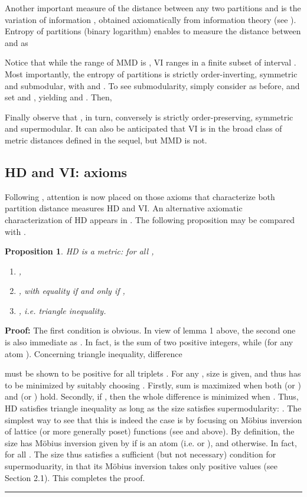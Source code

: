 \documentclass[a4paper,10pt]{article}
\newtheorem{proposition}[theorem]{Proposition}
\newenvironment{proof}[1][Proof]{\noindent\textbf{#1: }}{\ \rule{0.5em}{0.5em}}
\begin{document}
Another important measure of the distance between any two partitions  and  is the variation of information , obtained axiomatically from information theory (see
\cite[Expressions (15)-(22), pages 879-80]{Meila2007}). Entropy  of partitions  (binary logarithm) enables to measure the distance between  and  as

Notice that while the range of MMD is , VI ranges in a finite subset of interval . Most importantly,
the entropy  of partitions  is strictly order-inverting, symmetric and submodular, with  and . To see submodularity, simply consider
 as before, and set  and , yielding  and . Then, 

Finally observe that , in turn, conversely is strictly order-preserving, symmetric and supermodular. It can also be anticipated that VI is in the broad class of metric
distances defined in the sequel, but MMD is not.

\subsection{HD and VI: axioms}
Following \cite{Meila2007}, attention is now placed on those axioms that characterize both partition distance measures HD and VI. An alternative axiomatic characterization
of HD appears in \cite{MirkinCherny1970}. The following proposition may be compared with \cite[pp. 880-881, Property 1]{Meila2007}.
\begin{proposition}
HD is a \textsl{metric}: for all ,
\begin{enumerate}
\item ,
\item , with equality if and only if ,
\item , i.e. triangle inequality.
\end{enumerate}
\end{proposition}

\begin{proof}
The first condition is obvious. In view of lemma 1 above, the second one is also immediate as . In fact,  is the sum
 of two positive integers, while  (for any atom ). Concerning
triangle inequality, difference 

must be shown to be positive for all triplets . For any , size  is given, and thus 
has to be minimized by suitably choosing . Firstly, sum  is maximized when both  (or ) and  (or
) hold. Secondly, if , then the whole difference is minimized when . Thus, HD satisfies triangle inequality as long as the
size satisfies supermodularity: . The simplest way to see that this is indeed the case is by focusing on
M\"obius inversion of lattice (or more generally poset) functions (see \cite{Aigner79,RotaMobius} and above). By definition, the size  has M\"obius inversion
 given by  if  is an atom (i.e.  or ), and  otherwise. In fact,
 for all . The size thus satisfies a sufficient (but not necessary) condition for supermoduarity, in that its M\"obius
inversion takes only positive values (see Section 2.1). This completes the proof.
\end{proof}
\end{document}
